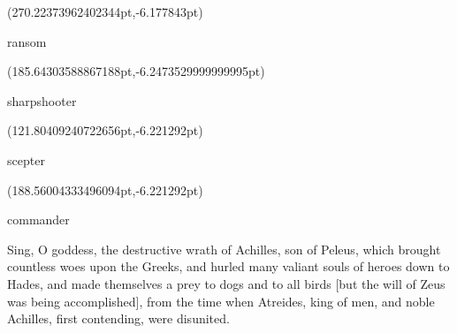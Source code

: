 \documentclass{ransom}
\begin{document}
\begin{foreignpage}
{\begin{textblock*}{84.77626037597656pt}(270.22373962402344pt,\pdfpageheight-199.12759399414062pt-6.177843pt)\parbox[b]{84.77626037597656pt}{\begin{blacktext}\begin{latin}ransom\end{latin}\end{blacktext}}\end{textblock*}
\begin{textblock*}{46.96996pt}(185.64303588867188pt,\pdfpageheight-172.12759399414062pt-6.2473529999999995pt)\parbox[b]{46.96996pt}{\begin{blacktext}\begin{latin}sharpshooter\end{latin}\end{blacktext}}\end{textblock*}
\begin{textblock*}{47.04443pt}(121.80409240722656pt,\pdfpageheight-145.12759399414062pt-6.221292pt)\parbox[b]{47.04443pt}{\begin{blacktext}\begin{latin}scepter\end{latin}\end{blacktext}}\end{textblock*}
\begin{textblock*}{54.07008pt}(188.56004333496094pt,\pdfpageheight-118.12759399414062pt-6.221292pt)\parbox[b]{54.07008pt}{\begin{blacktext}\begin{latin}commander\end{latin}\end{blacktext}}\end{textblock*}
 }
\end{foreignpage}



Sing, Ο goddess, the destructive wrath of Achilles, son of Peleus,
which brought countless woes upon the Greeks, and hurled many valiant
souls of heroes down to Hades, and made themselves a prey to dogs and
to all birds [but the will of Zeus was being accomplished], from the
time when Atreides, king of men, and noble Achilles, first contending,
were disunited.
\end{document}
